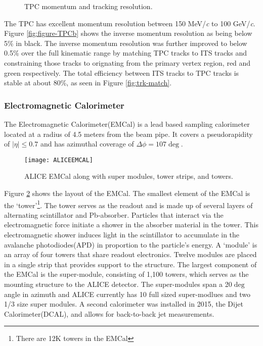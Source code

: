 \begin{figure}[h]
   \centering
   \caption{TPC momentum and tracking resolution\cite{Abelev:2014ffa}.}
   \label{fig:multipart-TPC}
\end{figure}

\noindent
The TPC has excellent momentum resolution between 150 MeV/\textit{c} to 100 GeV/\textit{c}\cite{LIPPMANN2012434}.  Figure \ref{fig:figure-TPCb} shows the inverse momentum resolution as being below 5\% in black.  The inverse momentum resolution was further improved to below 0.5\% over the full kinematic range by matching TPC tracks to ITS tracks and constraining those tracks to orignating from the primary vertex region, red and green respectively.  The total efficiency between ITS tracks to TPC tracks is stable at about 80\%, as seen in Figure \ref{fig:trk-match}.




\subsubsection{Electromagnetic Calorimeter}
The Electromagnetic Calorimeter(EMCal)\cite{1742-6596-293-1-012043} is a lead based sampling calorimeter located at a radius of 4.5 meters from the beam pipe.  It covers a pseudorapidity of $ \left | \eta \right | \leq 0.7$ and has azimuthal coverage of $ \Delta \phi = 107 \deg$.

\begin{figure}[h]
\texttt{[image: ALICEEMCAL]}
\centering
\caption{ALICE EMCal along with super modules, tower strips, and towers\cite{1742-6596-110-3-032006}.}
\label{fig:EMCal}
\end{figure}


Figure \ref{fig:EMCal} shows the layout of the EMCal.  The smallest element of the EMCal is the `tower'\footnote{There are 12K towers in the EMCal}.  The tower serves as the readout and is made up of several layers of alternating scintillator and Pb-absorber.  Particles that interact via the electromagnetic force initiate a shower in the absorber material in the tower.  This electromagnetic shower induces light in the scintillator  to accumulate in the avalanche photodiodes(APD) in proportion to the particle's energy.  A `module' is an array of four towers that share readout electronics.  Twelve modules are placed in a single strip that provides support to the structure.  The largest component of the EMCal is the super-module, consisting of 1,100 towers,  which serves as the mounting structure to the ALICE detector.  The super-modules span a 20$\deg$ angle in azimuth and ALICE currently has 10 full sized super-modlues and two 1/3 size super modules.  A second calorimeter was installed in 2015, the Dijet Calorimeter(DCAL), and allows for back-to-back jet measurements.


